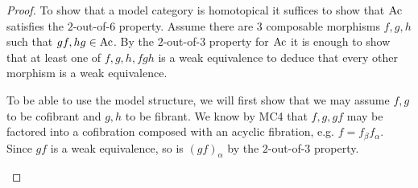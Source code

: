 \documentclass[../thesis.tex]{subfiles}
\begin{document}
            \begin{proof}
                To show that a model category is homotopical it suffices to show that $\tt{Ac}$ satisfies the $2$-out-of-$6$ property. Assume there are $3$ composable morphisms $f,g,h$ such that $gf,hg\in \tt{Ac}$. By the $2$-out-of-$3$ property for $\tt{Ac}$ it is enough to show that at least one of $f,g,h,fgh$ is a weak equivalence to deduce that every other morphism is a weak equivalence.
                \begin{center}
                \end{center}

                To be able to use the model structure, we will first show that we may assume $f,g$ to be cofibrant and $g,h$ to be fibrant. We know by MC4 that $f,g,gf$ may be factored into a cofibration composed with an acyclic fibration, e.g. $f = f_\beta f_\alpha$. Since $gf$ is a weak equivalence, so is $(gf)_\alpha$ by the $2$-out-of-$3$ property.
                \begin{center}
                \end{center}


\end{proof}
\end{document}
